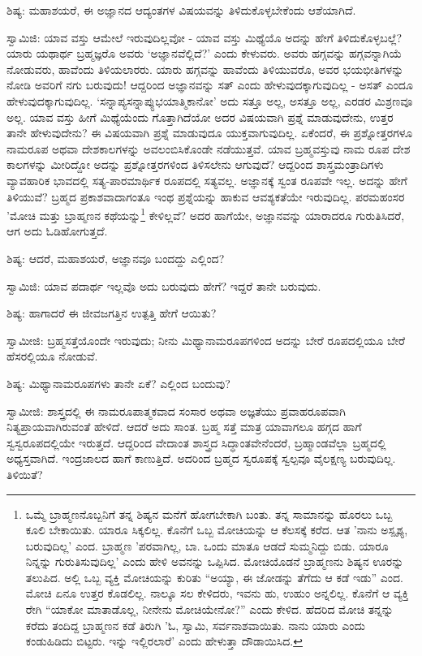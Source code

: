 ಶಿಷ್ಯ: ಮಹಾಶಯರೆ, ಈ ಅಜ್ಞಾನದ ಆದ್ಯಂತಗಳ ವಿಷಯವನ್ನು ತಿಳಿದುಕೊಳ್ಳಬೇಕೆಂದು ಆಶೆಯಾಗಿದೆ.

ಸ್ವಾಮಿಜಿ: ಯಾವ ವಸ್ತು ಆಮೇಲೆ ಇರುವುದಿಲ್ಲವೋ - ಯಾವ ವಸ್ತು ಮಿಥ್ಯೆಯೊ ಅದನ್ನು ಹೇಗೆ ತಿಳಿದುಕೊಳ್ಳಬಲ್ಲೆ? ಯಾರು ಯಥಾರ್ಥ ಬ್ರಹ್ಮಜ್ಞರೊ ಅವರು ‘ಅಜ್ಞಾನವೆಲ್ಲಿದೆ?’ ಎಂದು ಕೇಳುವರು. ಅವರು ಹಗ್ಗವನ್ನು ಹಗ್ಗವನ್ನಾಗಿಯೆ ನೋಡುವರು, ಹಾವೆಂದು ತಿಳಿಯಲಾರರು. ಯಾರು ಹಗ್ಗವನ್ನು ಹಾವೆಂದು ತಿಳಿಯುವರೊ, ಅವರ ಭಯಭೀತಿಗಳನ್ನು ನೋಡಿ ಅವರಿಗೆ ನಗು ಬರುವುದು! ಆದ್ದರಿಂದ ಅಜ್ಞಾನವನ್ನು ಸತ್ ಎಂದು ಹೇಳುವುದಕ್ಕಾಗುವುದಿಲ್ಲ - ಅಸತ್ ಎಂದೂ ಹೇಳುವುದಕ್ಕಾಗುವುದಿಲ್ಲ. ‘ಸನ್ನಾಪ್ಯಸನ್ನಾಪ್ಯುಭಯಾತ್ಮಿಕಾನೋ’ ಅದು ಸತ್ತೂ ಅಲ್ಲ, ಅಸತ್ತೂ ಅಲ್ಲ, ಎರಡರ ಮಿಶ್ರಣವೂ ಅಲ್ಲ. ಯಾವ ವಸ್ತು ಹೀಗೆ ಮಿಥ್ಯೆಯೆಂದು ಗೊತ್ತಾಗಿದೆಯೋ ಅದರ ವಿಷಯವಾಗಿ ಪ್ರಶ್ನೆ ಮಾಡುವುದೇನು, ಉತ್ತರ ತಾನೇ ಹೇಳುವುದೇನು? ಈ ವಿಷಯವಾಗಿ ಪ್ರಶ್ನೆ ಮಾಡುವುದೂ ಯುಕ್ತವಾಗುವುದಿಲ್ಲ. ಏಕೆಂದರೆ, ಈ ಪ್ರಶ್ನೋತ್ತರಗಳೂ ನಾಮರೂಪ ಅಥವಾ ದೇಶಕಾಲಗಳನ್ನು ಅವಲಂಬಿಸಿಕೊಂಡೇ ನಡೆಯುತ್ತವೆ. ಯಾವ ಬ್ರಹ್ಮವಸ್ತುವು ನಾಮ ರೂಪ ದೇಶ ಕಾಲಗಳನ್ನು ಮೀರಿದ್ದೋ ಅದನ್ನು ಪ್ರಶ್ನೋತ್ತರಗಳಿಂದ ತಿಳಿಸಲೇನು ಆಗುವುದೆ? ಆದ್ದರಿಂದ ಶಾಸ್ತ್ರಮಂತ್ರಾದಿಗಳು ವ್ಯಾವಹಾರಿಕ ಭಾವದಲ್ಲಿ ಸತ್ಯ-ಪಾರಮಾರ್ಥಿಕ ರೂಪದಲ್ಲಿ ಸತ್ಯವಲ್ಲ. ಅಜ್ಞಾನಕ್ಕೆ ಸ್ವಂತ ರೂಪವೇ ಇಲ್ಲ. ಅದನ್ನು ಹೇಗೆ ತಿಳಿಯುವೆ? ಬ್ರಹ್ಮದ ಪ್ರಕಾಶವಾದಾಗಂತೂ ಇಂಥ ಪ್ರಶ್ನೆಯನ್ನು ಹಾಕುವ ಆವಶ್ಯಕತೆಯೇ ಇರುವುದಿಲ್ಲ. ಪರಮಹಂಸರ 'ಮೋಚಿ ಮತ್ತು ಬ್ರಾಹ್ಮಣನ ಕಥೆಯನ್ನು\footnote{ಒಮ್ಮೆ ಬ್ರಾಹ್ಮಣನೊಬ್ಬನಿಗೆ ತನ್ನ ಶಿಷ್ಯನ ಮನೆಗೆ ಹೋಗಬೇಕಾಗಿ ಬಂತು. ತನ್ನ ಸಾಮಾನನ್ನು ಹೊರಲು ಒಬ್ಬ ಕೂಲಿ ಬೇಕಾಯಿತು. ಯಾರೂ ಸಿಕ್ಕಲಿಲ್ಲ. ಕೊನೆಗೆ ಒಬ್ಬ ಮೋಚಿಯನ್ನು ಆ ಕೆಲಸಕ್ಕೆ ಕರೆದ. ಆತ 'ನಾನು ಅಸ್ಪೃಶ್ಯ, ಬರುವುದಿಲ್ಲ' ಎಂದ. ಬ್ರಾಹ್ಮಣ 'ಪರವಾಗಿಲ್ಲ, ಬಾ. ಒಂದು ಮಾತೂ ಆಡದೆ ಸುಮ್ಮನಿದ್ದು ಬಿಡು. ಯಾರೂ ನಿನ್ನನ್ನು ಗುರುತಿಸುವುದಿಲ್ಲ' ಎಂದು ಹೇಳಿ ಅವನನ್ನು ಒಪ್ಪಿಸಿದ. ಮೋಚಿಯೊಡನೆ ಬ್ರಾಹ್ಮಣನು ಶಿಷ್ಯನ ಊರನ್ನು ತಲುಪಿದ. ಅಲ್ಲಿ ಒಬ್ಬ ವ್ಯಕ್ತಿ ಮೋಚಿಯನ್ನು ಕುರಿತು “ಅಯ್ಯಾ, ಈ ಜೋಡನ್ನು ತೆಗೆದು ಆ ಕಡೆ ಇಡು” ಎಂದ. ಮೋಚಿ ಏನೂ ಉತ್ತರ ಕೊಡಲಿಲ್ಲ. ನಾಲ್ಕೂ ಸಲ ಕೇಳಿದರು, ಇವನು ಹು, ಉಹುಂ ಅನ್ನಲಿಲ್ಲ. ಕೊನೆಗೆ ಆ ವ್ಯಕ್ತಿ ರೇಗಿ “ಯಾಕೋ ಮಾತಾಡೊಲ್ಲ, ನೀನೇನು ಮೋಚಿಯೇನೋ?” ಎಂದು ಕೇಳಿದ. ಹೆದರಿದ ಮೋಚಿ ತನ್ನನ್ನು ಕರೆದು ತಂದಿದ್ದ ಬ್ರಾಹ್ಮಣನ ಕಡೆ ತಿರುಗಿ 'ಓ, ಸ್ವಾಮಿ, ಸರ್ವನಾಶವಾಯಿತು. ನಾನು ಯಾರು ಎಂದು ಕಂಡುಹಿಡಿದು ಬಿಟ್ಟರು. ಇನ್ನು ಇಲ್ಲಿರಲಾರೆ' ಎಂದು ಹೇಳುತ್ತಾ ದೌಡಾಯಿಸಿದ.} ಕೇಳಿಲ್ಲವೆ? ಅದರ ಹಾಗೆಯೇ, ಅಜ್ಞಾನವನ್ನು ಯಾರಾದರೂ ಗುರುತಿಸಿದರೆ, ಆಗ ಅದು ಓಡಿಹೋಗುತ್ತದೆ.

ಶಿಷ್ಯ: ಆದರೆ, ಮಹಾಶಯರೆ, ಅಜ್ಞಾನವೂ ಬಂದದ್ದು ಎಲ್ಲಿಂದ?

ಸ್ವಾಮಿಜಿ: ಯಾವ ಪದಾರ್ಥ ಇಲ್ಲವೊ ಅದು ಬರುವುದು ಹೇಗೆ? ಇದ್ದರೆ ತಾನೇ ಬರುವುದು.

ಶಿಷ್ಯ: ಹಾಗಾದರೆ ಈ ಜೀವಜಗತ್ತಿನ ಉತ್ಪತ್ತಿ ಹೇಗೆ ಆಯಿತು?

ಸ್ವಾಮೀಜಿ: ಬ್ರಹ್ಮಸತ್ತೆಯೊಂದೇ ಇರುವುದು; ನೀನು ಮಿಥ್ಯಾನಾಮರೂಪಗಳಿಂದ ಅದನ್ನು ಬೇರೆ ರೂಪದಲ್ಲಿಯೂ ಬೇರೆ ಹೆಸರಲ್ಲಿಯೂ ನೋಡುವೆ.

ಶಿಷ್ಯ: ಮಿಥ್ಯಾನಾಮರೂಪಗಳು ತಾನೇ ಏಕೆ? ಎಲ್ಲಿಂದ ಬಂದುವು?

ಸ್ವಾಮೀಜಿ: ಶಾಸ್ತ್ರದಲ್ಲಿ ಈ ನಾಮರೂಪಾತ್ಮಕವಾದ ಸಂಸಾರ ಅಥವಾ ಅಜ್ಞತೆಯು ಪ್ರವಾಹರೂಪವಾಗಿ ನಿತ್ಯಪ್ರಾಯವಾಗಿರುವಂತೆ ಹೇಳಿದೆ. ಆದರೆ ಅದು ಸಾಂತ. ಬ್ರಹ್ಮ ಸತ್ತೆ ಮಾತ್ರ ಯಾವಾಗಲೂ ಹಗ್ಗದ ಹಾಗೆ ಸ್ವಸ್ವರೂಪದಲ್ಲಿಯೇ ಇರುತ್ತದೆ. ಆದ್ದರಿಂದ ವೇದಾಂತ ಶಾಸ್ತ್ರದ ಸಿದ್ಧಾಂತವೇನೆಂದರೆ, ಬ್ರಹ್ಮಾಂಡವೆಲ್ಲಾ ಬ್ರಹ್ಮದಲ್ಲಿ ಅಧ್ಯಸ್ತವಾಗಿದೆ. ಇಂದ್ರಜಾಲದ ಹಾಗೆ ಕಾಣುತ್ತಿದೆ. ಅದರಿಂದ ಬ್ರಹ್ಮದ ಸ್ವರೂಪಕ್ಕೆ ಸ್ವಲ್ಪವೂ ವೈಲಕ್ಷಣ್ಯ ಬರುವುದಿಲ್ಲ. ತಿಳಿಯಿತೆ?

